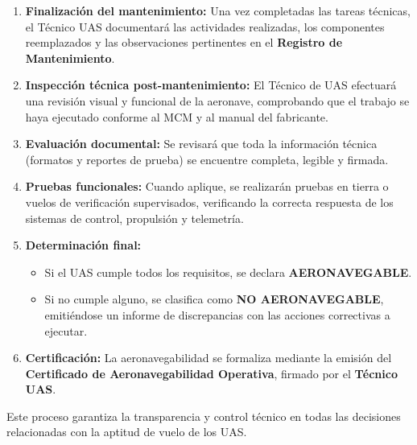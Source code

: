 \begin{enumerate}
    \item \textbf{Finalización del mantenimiento:} Una vez completadas las tareas técnicas, el Técnico UAS documentará las actividades realizadas, los componentes reemplazados y las observaciones pertinentes en el \textbf{Registro de Mantenimiento}.

    \item \textbf{Inspección técnica post-mantenimiento:} El Técnico de UAS efectuará una revisión visual y funcional de la aeronave, comprobando que el trabajo se haya ejecutado conforme al MCM y al manual del fabricante.

    \item \textbf{Evaluación documental:} Se revisará que toda la información técnica (formatos y reportes de prueba) se encuentre completa, legible y firmada.

    \item \textbf{Pruebas funcionales:} Cuando aplique, se realizarán pruebas en tierra o vuelos de verificación supervisados, verificando la correcta respuesta de los sistemas de control, propulsión y telemetría.

    \item \textbf{Determinación final:}
        \begin{itemize}
            \item Si el UAS cumple todos los requisitos, se declara \textbf{AERONAVEGABLE}.

            \item Si no cumple alguno, se clasifica como \textbf{NO AERONAVEGABLE}, emitiéndose un informe de discrepancias con las acciones correctivas a ejecutar.
        \end{itemize}

    \item \textbf{Certificación:} La aeronavegabilidad se formaliza mediante la emisión del \textbf{Certificado de Aeronavegabilidad Operativa}, firmado por el \textbf{Técnico UAS}.
\end{enumerate}

Este proceso garantiza la transparencia y control técnico en todas las decisiones relacionadas con la aptitud de vuelo de los UAS.

